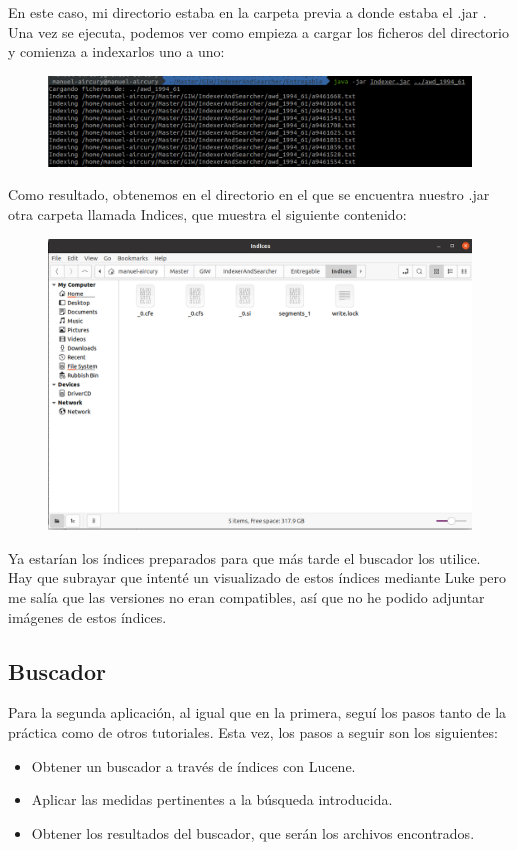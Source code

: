 En este caso, mi directorio estaba en la carpeta previa a donde estaba el .jar . Una vez se ejecuta, podemos ver como empieza a cargar los ficheros del directorio y comienza a indexarlos uno a uno:

\begin{figure}[H]
	\centering
	\includegraphics[width=1\linewidth]{Imagenes/screenshot002}
	\label{fig:screenshot002}
\end{figure}

Como resultado, obtenemos en el directorio en el que se encuentra nuestro .jar otra carpeta llamada Indices, que muestra el siguiente contenido:

\begin{figure}[H]
	\centering
	\includegraphics[width=0.7\linewidth]{Imagenes/screenshot003}
	\label{fig:screenshot003}
\end{figure}

Ya estarían los índices preparados para que más tarde el buscador los utilice.\\

Hay que subrayar que intenté un visualizado de estos índices mediante Luke pero me salía que las versiones no eran compatibles, así que no he podido adjuntar imágenes de estos índices.

\newpage
\subsection{Buscador}

Para la segunda aplicación, al igual que en la primera, seguí los pasos tanto de la práctica como de otros tutoriales. Esta vez, los pasos a seguir son los siguientes:
\begin{itemize}
	\item Obtener un buscador a través de índices con Lucene.
	\item Aplicar las medidas pertinentes a la búsqueda introducida.
	\item Obtener los resultados del buscador, que serán los archivos encontrados.
\end{itemize}

